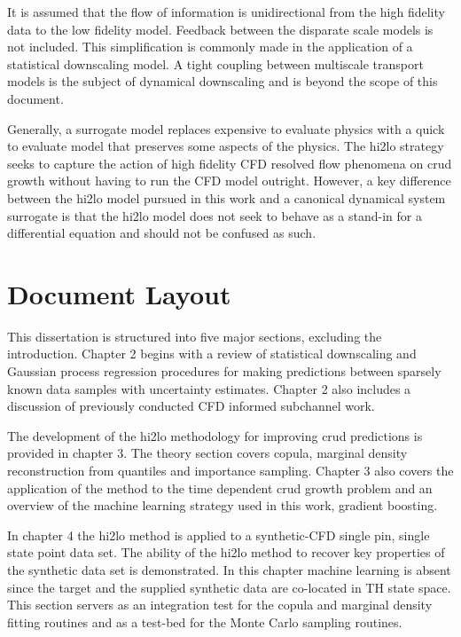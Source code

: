 
It is assumed that the flow of information is unidirectional from the high fidelity data to the low fidelity model.  Feedback between the disparate scale models is not included.  This simplification is commonly made in the application of a statistical downscaling model.  A tight coupling between multiscale transport models is the subject of dynamical downscaling and is beyond the scope of this document.

Generally, a surrogate model replaces expensive to evaluate physics with a quick to evaluate model that preserves some aspects of the physics. The hi2lo strategy seeks to capture the action of high fidelity CFD resolved flow phenomena on crud growth without having to run the CFD model outright.  However, a key difference between the hi2lo model pursued in this work and a canonical dynamical system surrogate is that the hi2lo model does not seek to behave as a stand-in for a differential equation and should not be confused as such.  


\section{Document Layout}

This dissertation is structured into five major sections, excluding the introduction.  Chapter 2 begins with a review of statistical downscaling and Gaussian process regression procedures for making predictions between sparsely known data samples with uncertainty estimates.  Chapter 2 also includes a discussion of previously conducted CFD informed subchannel work. 

The development of the hi2lo methodology for improving crud predictions is provided in chapter 3.  The theory section covers copula, marginal density reconstruction from quantiles and importance sampling.  Chapter 3 also covers the application of the method to the time dependent crud growth problem and an overview of the machine learning strategy used in this work, gradient boosting.   

In chapter 4 the hi2lo method is applied to a synthetic-CFD single pin, single state point data set.  The ability of the hi2lo method to recover key properties of the synthetic data set is demonstrated.   In this chapter machine learning is absent since the target and the supplied synthetic data are co-located in TH state space.  This section servers as an integration test for the copula and marginal density fitting routines and as a test-bed for the Monte Carlo sampling routines.

